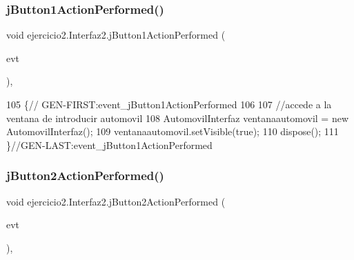\mbox{\label{classejercicio2_1_1_interfaz2_a615dc098c291d5ae182d63fedd6b030d}} 
\subsubsection{\texorpdfstring{j\+Button1\+Action\+Performed()}{jButton1ActionPerformed()}}
{\footnotesize\ttfamily void ejercicio2.\+Interfaz2.\+j\+Button1\+Action\+Performed (\begin{DoxyParamCaption}\item[{java.\+awt.\+event.\+Action\+Event}]{evt }\end{DoxyParamCaption})\hspace{0.3cm}{\ttfamily [inline]}, {\ttfamily [private]}}


\begin{DoxyCode}
105                                                                          \{\textcolor{comment}{//
      GEN-FIRST:event\_jButton1ActionPerformed}
106         
107         \textcolor{comment}{//accede a la ventana de introducir automovil}
108         AutomovilInterfaz ventanaautomovil = \textcolor{keyword}{new} AutomovilInterfaz();
109         ventanaautomovil.setVisible(\textcolor{keyword}{true});
110         dispose();
111     \}\textcolor{comment}{//GEN-LAST:event\_jButton1ActionPerformed}
\end{DoxyCode}
\mbox{\label{classejercicio2_1_1_interfaz2_a3eb4f2b32d3fd61ab73e7fa5e272d9ef}} 
\subsubsection{\texorpdfstring{j\+Button2\+Action\+Performed()}{jButton2ActionPerformed()}}
{\footnotesize\ttfamily void ejercicio2.\+Interfaz2.\+j\+Button2\+Action\+Performed (\begin{DoxyParamCaption}\item[{java.\+awt.\+event.\+Action\+Event}]{evt }\end{DoxyParamCaption})\hspace{0.3cm}{\ttfamily [inline]}, {\ttfamily [private]}}


